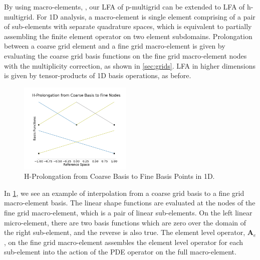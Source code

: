 \documentclass[review]{siamart190516}
\begin{document}
By using macro-elements, \cite{kumar2019local, brown2019local}, our LFA of p-multigrid can be extended to LFA of h-multigrid.
For 1D analysis, a macro-element is single element comprising of a pair of sub-elements with separate quadrature spaces, which is equivalent to partially assembling the finite element operator on two element subdomains.
Prolongation between a coarse grid element and a fine grid macro-element is given by evaluating the coarse grid basis functions on the fine grid macro-element nodes with the multiplicity correction, as shown in \cref{sec:grids}.
LFA in higher dimensions is given by tensor-products of 1D basis operations, as before.

\begin{figure}[!ht]
  \centering
  \includegraphics[width=0.48\textwidth]{img/hProlongation}
  \caption{H-Prolongation from Coarse Basis to Fine Basis Points in 1D.}
  \label{fig:h_prolongation}
\end{figure}

In \cref{fig:h_prolongation}, we see an example of interpolation from a coarse grid basis to a fine grid macro-element basis.
The linear shape functions are evaluated at the nodes of the fine grid macro-element, which is a pair of linear sub-elements.
On the left linear micro-element, there are two basis functions which are zero over the domain of the right sub-element, and the reverse is also true.
The element level operator, $\mathbf{A}_e$, on the fine grid macro-element assembles the element level operator for each sub-element into the action of the PDE operator on the full macro-element.
\end{document}
